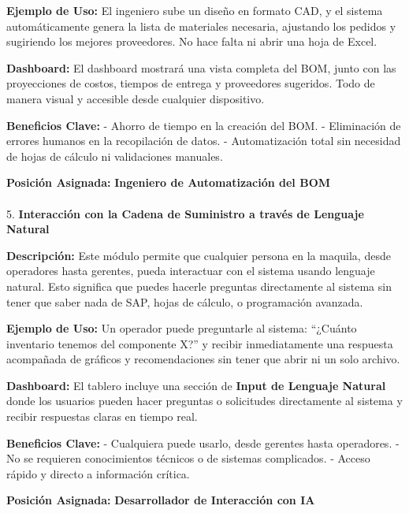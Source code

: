 \documentclass[
  10pt,
  letterpaper,
]{book}
\makeatletter
\let\oldparagraph\paragraph
\renewcommand{\paragraph}{
    \@ifstar
      \xxxParagraphStar
      \xxxParagraphNoStar
  }
\newcommand{\xxxParagraphStar}[1]{\oldparagraph*{#1}\mbox{}}
\newcommand{\xxxParagraphNoStar}[1]{\oldparagraph{#1}\mbox{}}
\makeatother
\begin{document}
\textbf{Ejemplo de Uso:} El ingeniero sube un diseño en formato CAD, y
el sistema automáticamente genera la lista de materiales necesaria,
ajustando los pedidos y sugiriendo los mejores proveedores. No hace
falta ni abrir una hoja de Excel.

\textbf{Dashboard:} El dashboard mostrará una vista completa del BOM,
junto con las proyecciones de costos, tiempos de entrega y proveedores
sugeridos. Todo de manera visual y accesible desde cualquier
dispositivo.

\textbf{Beneficios Clave:} - Ahorro de tiempo en la creación del BOM. -
Eliminación de errores humanos en la recopilación de datos. -
Automatización total sin necesidad de hojas de cálculo ni validaciones
manuales.

\textbf{Posición Asignada:} \textbf{Ingeniero de Automatización del BOM}

\paragraph{\texorpdfstring{5. \textbf{Interacción con la Cadena de
Suministro a través de Lenguaje
Natural}}{5. Interacción con la Cadena de Suministro a través de Lenguaje Natural}}\label{interacciuxf3n-con-la-cadena-de-suministro-a-travuxe9s-de-lenguaje-natural}

\textbf{Descripción:} Este módulo permite que cualquier persona en la
maquila, desde operadores hasta gerentes, pueda interactuar con el
sistema usando lenguaje natural. Esto significa que puedes hacerle
preguntas directamente al sistema sin tener que saber nada de SAP, hojas
de cálculo, o programación avanzada.

\textbf{Ejemplo de Uso:} Un operador puede preguntarle al sistema:
``¿Cuánto inventario tenemos del componente X?'' y recibir
inmediatamente una respuesta acompañada de gráficos y recomendaciones
sin tener que abrir ni un solo archivo.

\textbf{Dashboard:} El tablero incluye una sección de \textbf{Input de
Lenguaje Natural} donde los usuarios pueden hacer preguntas o
solicitudes directamente al sistema y recibir respuestas claras en
tiempo real.

\textbf{Beneficios Clave:} - Cualquiera puede usarlo, desde gerentes
hasta operadores. - No se requieren conocimientos técnicos o de sistemas
complicados. - Acceso rápido y directo a información crítica.

\textbf{Posición Asignada:} \textbf{Desarrollador de Interacción con IA}
\end{document}
